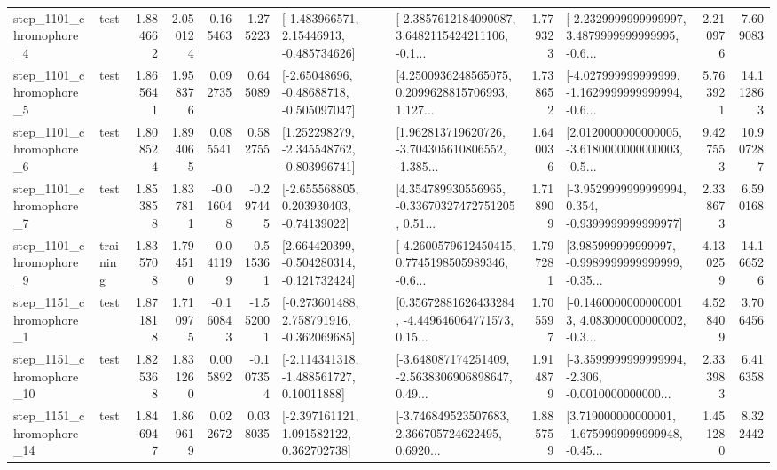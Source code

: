 \begin{tabular}{llrrrrllrlrr}
  step\_1101\_chromophore\_4 &      test &      1.884662 &    2.050124 &      0.165463 &  1.275223 &    [-1.483966571, 2.15446913, -0.485734626] &  [-2.3857612184090087, 3.6482115424211106, -0.1... &       1.779323 &  [-2.2329999999999997, 3.4879999999999995, -0.6... &            2.210976 &          7.609083 \\
  step\_1101\_chromophore\_5 &      test &      1.865641 &    1.958376 &      0.092735 &  0.645089 &    [-2.65048696, -0.48688718, -0.505097047] &  [4.2500936248565075, 0.2099628815706993, 1.127... &       1.738652 &  [-4.027999999999999, -1.1629999999999994, -0.6... &            5.763921 &         14.112863 \\
  step\_1101\_chromophore\_6 &      test &      1.808524 &    1.894065 &      0.085541 &  0.582755 &   [1.252298279, -2.345548762, -0.803996741] &  [1.962813719620726, -3.704305610806552, -1.385... &       1.640036 &  [2.0120000000000005, -3.6180000000000003, -0.5... &            9.427553 &         10.907287 \\
  step\_1101\_chromophore\_7 &      test &      1.853858 &    1.837811 &     -0.016048 & -0.297445 &    [-2.655568805, 0.203930403, -0.74139022] &  [4.354789930556965, -0.33670327472751205, 0.51... &       1.718909 &  [-3.9529999999999994, 0.354, -0.9399999999999977] &            2.338673 &          6.590168 \\
  step\_1101\_chromophore\_9 &  training &      1.835708 &    1.794510 &     -0.041199 & -0.515361 &   [2.664420399, -0.504280314, -0.121732424] &  [-4.2600579612450415, 0.7745198505989346, -0.6... &       1.797281 &  [3.985999999999997, -0.9989999999999999, -0.35... &            4.130259 &         14.166526 \\
  step\_1151\_chromophore\_1 &      test &      1.871818 &    1.710975 &     -0.160843 & -1.552001 &   [-0.273601488, 2.758791916, -0.362069685] &  [0.35672881626433284, -4.449646064771573, 0.15... &       1.705597 &  [-0.14600000000000013, 4.083000000000002, -0.3... &            4.528409 &          3.706456 \\
 step\_1151\_chromophore\_10 &      test &      1.825368 &    1.831260 &      0.005892 & -0.107354 &    [-2.114341318, -1.488561727, 0.10011888] &  [-3.648087174251409, -2.5638306906898647, 0.49... &       1.914879 &  [-3.3599999999999994, -2.306, -0.0010000000000... &            2.333983 &          6.416358 \\
 step\_1151\_chromophore\_14 &      test &      1.846947 &    1.869619 &      0.022672 &  0.038035 &    [-2.397161121, 1.091582122, 0.362702738] &  [-3.746849523507683, 2.366705724622495, 0.6920... &       1.885759 &  [3.719000000000001, -1.6759999999999948, -0.45... &            1.451280 &          8.322442 \\

\end{tabular}
